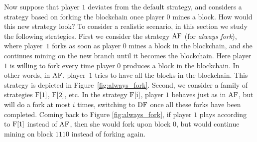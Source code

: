 Now suppose that player $1$ deviates from the default strategy, and considers a strategy based on forking the blockchain once player $0$ mines a block. 
How would this new strategy look? To consider a realistic scenario, in this section we study the following strategies. 
%
%
First we consider the strategy $\text{\rm AF}$ (for \emph{always fork}), where player~$1$ forks as soon as player $0$ mines a block in the blockchain, and she continues mining on the new branch until it becomes the blockchain. Here player $1$ is willing to fork every time player $0$ produces a block in the blockchain. In other words, 
in $\text{\rm AF}$, player~$1$ tries to have all the blocks in the blockchain. This strategy is depicted in Figure~\ref{fig:always_fork}.
Second, we consider a family of strategies $\text{\rm F[{1}]}$, $\text{\rm F[{2}]}$, etc. In the strategy $\text{\rm F[{i}]}$, player $1$ behaves just as in $\text{\rm AF}$, but will do a fork at most $i$ times, %
switching to $\text{\rm DF}$ once 
all these forks have been completed. Coming back to Figure \ref{fig:always_fork}, if player $1$ plays according to $\text{\rm F[{1}]}$ instead of $\text{\rm AF}$, then she would fork upon block $0$, but 
would continue mining on block $1110$ instead of forking again. 

